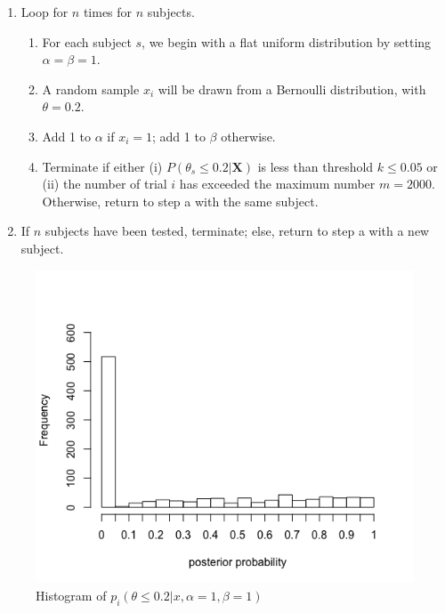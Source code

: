 \begin{enumerate}
\def\labelenumi{\arabic{enumi}.}
\tightlist
\item
  Loop for \(n\) times for \(n\) subjects.

  \begin{enumerate}
  \def\labelenumii{\alph{enumii}.}
  \tightlist
  \item
    For each subject \(s\), we begin with a flat uniform distribution by
    setting \(\alpha = \beta = 1\).
  \item
    A random sample \(x_i\) will be drawn from a Bernoulli distribution,
    with \(\theta = 0.2\).
  \item
    Add 1 to \(\alpha\) if \(x_i =1\); add 1 to \(\beta\) otherwise.
  \item
    Terminate if either (i) \(P(\theta_s \leq 0.2|\mathbf{X})\) is less
    than threshold \(k\leq 0.05\) or (ii) the number of trial \(i\) has exceeded
    the maximum number \(m=2000\). Otherwise, return to step a with the same
    subject.
  \end{enumerate}
\item
  If \(n\) subjects have been tested, terminate; else, return to step a
  with a new subject.

\end{enumerate}



\begin{figure}[h] 
\begin{center}
\includegraphics[scale=0.5]{Bayesstopflatallpost.png}
	\caption{Histogram of $p_i(\theta\leq 0.2|x,\alpha=1, \beta=1)$}
	\label{fig:bayesflatposterior}
\end{center}	
\end{figure}

